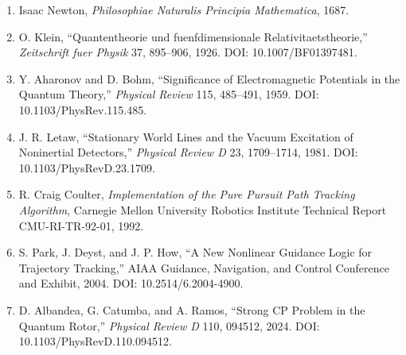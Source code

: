 \documentclass[
  a4paper,
]{article}
\providecommand{\tightlist}{%
  \setlength{\itemsep}{0pt}\setlength{\parskip}{0pt}}
\begin{document}
\begin{enumerate}
\def\labelenumi{\arabic{enumi}.}
\setcounter{enumi}{5}
\tightlist
\item
  Isaac Newton, \emph{Philosophiae Naturalis Principia Mathematica},
  1687.
\item
  O. Klein, ``Quantentheorie und fuenfdimensionale
  Relativitaetstheorie,'' \emph{Zeitschrift fuer Physik} 37, 895--906,
  1926. DOI: 10.1007/BF01397481.
\item
  Y. Aharonov and D. Bohm, ``Significance of Electromagnetic Potentials
  in the Quantum Theory,'' \emph{Physical Review} 115, 485--491, 1959.
  DOI: 10.1103/PhysRev.115.485.
\item
  J. R. Letaw, ``Stationary World Lines and the Vacuum Excitation of
  Noninertial Detectors,'' \emph{Physical Review D} 23, 1709--1714,
  1981. DOI: 10.1103/PhysRevD.23.1709.
\item
  R. Craig Coulter, \emph{Implementation of the Pure Pursuit Path
  Tracking Algorithm}, Carnegie Mellon University Robotics Institute
  Technical Report CMU-RI-TR-92-01, 1992.
\item
  S. Park, J. Deyst, and J. P. How, ``A New Nonlinear Guidance Logic for
  Trajectory Tracking,'' AIAA Guidance, Navigation, and Control
  Conference and Exhibit, 2004. DOI: 10.2514/6.2004-4900.
\item
  D. Albandea, G. Catumba, and A. Ramos, ``Strong CP Problem in the
  Quantum Rotor,'' \emph{Physical Review D} 110, 094512, 2024. DOI:
  10.1103/PhysRevD.110.094512.
\end{enumerate}
\end{document}
